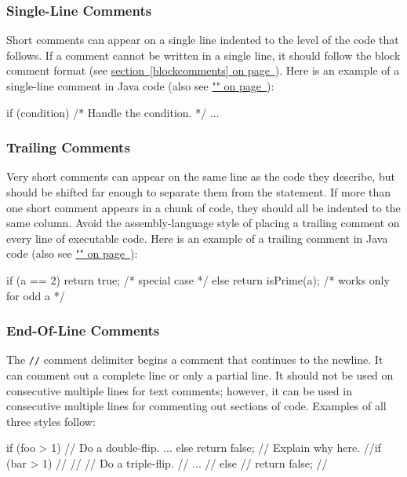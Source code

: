 \documentclass{article}
\begin{document}
\subsubsection{Single-Line Comments}
\label{singlelinecomments}

Short comments can appear on a single line indented to the level of the code that follows. If a
comment cannot be written in a single line, it should follow the block comment format (see
\hyperref[blockcomments]{section~\ref*{blockcomments} on page~\pageref*{blockcomments}}). Here is
an example of a single-line comment in Java code (also see
\hyperref[doccomments]{"" on page~\pageref*{doccomments}}):

\begin{snippet}
if (condition) {
    /* Handle the condition. */
    ...
}
\end{snippet}

\subsubsection{Trailing Comments}

Very short comments can appear on the same line as the code they describe, but should be shifted far
enough to separate them from the statement. If more than one short comment appears in a chunk of
code, they should all be indented to the same column. Avoid the assembly-language style of placing a
trailing comment on every line of executable code. Here is an example of a trailing comment in Java
code (also see \hyperref[doccomments]{"" on page~\pageref*{doccomments}}):

\begin{snippet}
if (a == 2) {
    return true; /* special case */
} else {
    return isPrime(a); /* works only for odd a */
}
\end{snippet}

\subsubsection{End-Of-Line Comments}

The \texttt{//} comment delimiter begins a comment that continues to the newline. It can comment out
a complete line or only a partial line. It should not be used on consecutive multiple lines for text
comments; however, it can be used in consecutive multiple lines for commenting out sections of
code. Examples of all three styles follow:

\begin{snippet}
if (foo > 1) {
    // Do a double-flip.
    ...
} else {
    return false; // Explain why here.
}
//if (bar > 1) {
//
//    // Do a triple-flip.
//    ...
//} else {
//    return false;
//}
\end{snippet}
\end{document}
